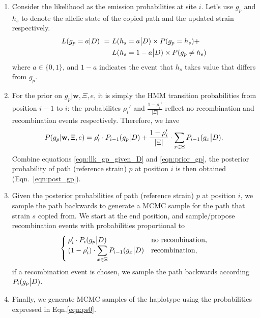 \documentclass{bioinfo}
\begin{document}
\begin{enumerate}
\item Consider the likelihood as the emission probabilities at site $i$. Let's use $g_p$ and $h_s$ to denote the allelic state of the copied path and the updated strain respectively.
\begin{equation}
\begin{split}
L(g_p = a | D) ~ = ~ & L(h_s = a \big{|} D) \times P(g_p = h_s) + \\
                     & L(h_s = 1 - a \big{|} D) \times P(g_p \neq h_s) \label{eqn:llk_gp_given_D}
\end{split}
\end{equation}
where $a\in \{0,1\}$, and $1-a$ indicates the event that $h_s$ takes value that differs from $g_p$.

\item For the prior on $g_p|\mathbf{w}, \Xi, e$, it is simply the \citet{Li2003} HMM transition probabilities from position $i-1$ to $i$: the probabilites $\rho_i'$ and $\frac{1-\rho_i'}{|\Xi|}$ reflect no recombination and recombination events respectively. Therefore, we have
\begin{equation}
P(g_p|\mathbf{w}, \Xi, e) = \rho_i' \cdot P_{i-1}(g_p \big{|} D)  +  \frac{1-\rho_i'}{|\Xi|} \cdot \displaystyle\sum_{x\in \Xi} P_{i-1} (g_x \big{|} D).\label{eqn:prior_gp}
\end{equation}
Combine equations \eqref{eqn:llk_gp_given_D} and \eqref{eqn:prior_gp}, the posterior probability of path (reference strain) $p$ at position $i$ is then obtained (Eqn.~\eqref{eqn:post_gp}).

\item Given the posterior probabilities of path (reference strain) $p$ at position $i$, we sample the path backwards to generate a MCMC sample for the path that strain $s$ copied from. We start at the end position, and sample/propose recombination events with probabilities proportional to
$$
\begin{cases}
\rho_i' \cdot P_i(g_p \big{|} D) & \text{no recombination},\\
\displaystyle ( 1-\rho_i' ) \cdot \sum_{x\in \Xi} P_{i-1}(g_x \big{|} D) & \text{recombination},
\end{cases}
$$
if a recombination event is chosen, we sample the path backwards according $P_i(g_p \big{|} D)$.

\item Finally, we generate MCMC samples of the haplotype using the probabilities expressed in Eqn.\eqref{eqn:ps0}.
\end{enumerate}
\end{document}

